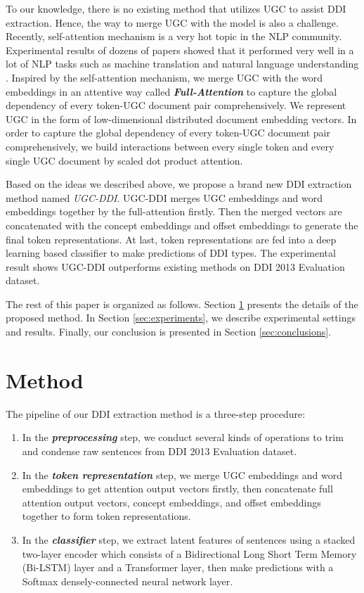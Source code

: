 \documentclass[conference]{IEEEtran}
\begin{document}
To our knowledge, there is no existing method that utilizes UGC to assist DDI extraction.
Hence, the way to merge UGC with the model is also a challenge.
Recently, self-attention mechanism is a very hot topic in the NLP community.
Experimental results of dozens of papers showed that it performed very well in a lot of NLP tasks
such as machine translation \cite{vaswani_attention_2017} and natural language understanding \cite{shen_disan:_2017}.
Inspired by the self-attention mechanism, we merge UGC with the word embeddings in an attentive way called 
\emph{\textbf{Full-Attention}} to capture the global dependency of every token-UGC document pair comprehensively.
We represent UGC in the form of low-dimensional distributed document embedding vectors.
In order to capture the global dependency of every token-UGC document pair comprehensively,
we build interactions between every single token and every single UGC document by scaled dot product attention.

Based on the ideas we described above, we propose a brand new DDI extraction method named \emph{UGC-DDI}.
UGC-DDI merges UGC embeddings and word embeddings together by the full-attention firstly.
Then the merged vectors are concatenated with the concept embeddings and offset embeddings to generate the final token representations.
At last, token representations are fed into a deep learning based classifier to make predictions of DDI types.
The experimental result shows UGC-DDI outperforms existing methods on DDI 2013 Evaluation dataset.

The rest of this paper is organized as follows.
Section \ref{sec:method} presents the details of the proposed method.
In Section \ref{sec:experiments}, we describe experimental settings and results.
Finally, our conclusion is presented in Section \ref{sec:conclusions}.

\section{Method}
\label{sec:method}

The pipeline of our DDI extraction method is a three-step procedure:

\begin{enumerate}
	\item In the \emph{\textbf{preprocessing}} step, we conduct several kinds of operations to trim and condense raw sentences from DDI 2013 Evaluation dataset.
	\item In the \emph{\textbf{token representation}} step, we merge UGC embeddings and word embeddings to get attention output vectors
	firstly, then concatenate full attention output vectors, concept embeddings, and offset embeddings together to form token representations.
	\item In the \emph{\textbf{classifier}} step, we extract latent features of sentences using a stacked
	two-layer encoder which consists of a Bidirectional Long Short Term Memory (Bi-LSTM) layer and a Transformer layer,
	then make predictions with a Softmax densely-connected neural network layer.
\end{enumerate}
\end{document}
